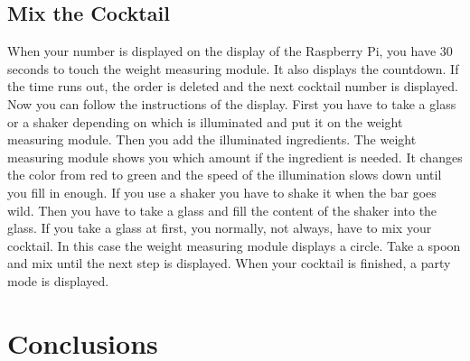 \documentclass{acm_proc_article-sp}
\begin{document}
 \subsection{Mix the Cocktail}
When your number is displayed on the display of the Raspberry Pi, you have 30 seconds to touch the weight measuring module. It also displays the countdown. If the time runs out, the order is deleted and the next cocktail number is displayed. \\
Now you can follow the instructions of the display. First you have to take a glass or a shaker depending on which is illuminated and put it on the weight measuring module. Then you add the illuminated ingredients. The weight measuring module shows you which amount if the ingredient is needed. It changes the color from red to green and the speed of the illumination slows down until you fill in enough. If you use a shaker you have to shake it when the bar goes wild. Then you have to take a glass and fill the content of the shaker into the glass. If you take a glass at first, you normally, not always, have to mix your cocktail. In this case the weight measuring module displays a circle. Take a spoon and mix until the next step is displayed. When your cocktail is finished, a party mode is displayed. 


\section{Conclusions}
\end{document}
